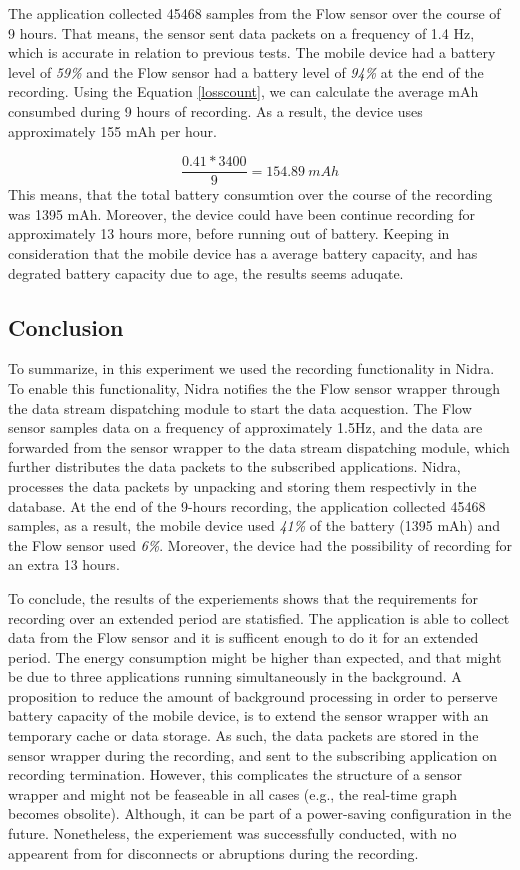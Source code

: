 The application collected 45468 samples from the Flow sensor over the course of 9 hours. That means, the sensor sent data packets on a frequency of 1.4 Hz, which is accurate in relation to previous tests. The mobile device had a battery level of \textit{59\%} and the Flow sensor had a battery level of \textit{94\%} at the end of the recording. Using the Equation \ref{losscount}, we can calculate the average mAh consumbed during 9 hours of recording. As a result, the device uses approximately 155 mAh per hour. 

\begin{equation}
\frac{0.41 * 3400}{9} = 154.89\ mAh
\end{equation}
This means, that the total battery consumtion over the course of the recording was 1395 mAh. Moreover, the device could have been continue recording for approximately 13 hours more, before running out of battery. Keeping in consideration that the mobile device has a average battery capacity, and has degrated battery capacity due to age, the results seems aduqate. 

\subsection{Conclusion}
To summarize, in this experiment we used the recording functionality in Nidra. To enable this functionality, Nidra notifies the the Flow sensor wrapper through the data stream dispatching module to start the data acquestion. The Flow sensor samples data on a frequency of approximately 1.5Hz, and the data are forwarded from the sensor wrapper to the data stream dispatching module, which further distributes the data packets to the subscribed applications. Nidra, processes the data packets by unpacking and storing them respectivly in the database. At the end of the 9-hours recording, the application collected 45468 samples, as a result, the mobile device used \textit{41\%} of the battery (1395 mAh) and the Flow sensor used \textit{6\%}. Moreover, the device had the possibility of recording for an extra 13 hours.

To conclude, the results of the experiements shows that the requirements for recording over an extended period are statisfied. The application is able to collect data from the Flow sensor and it is sufficent enough to do it for an extended period. The energy consumption might be higher than expected, and that might be due to three applications running simultaneously in the background. A proposition to reduce the amount of background processing in order to perserve battery capacity of the mobile device, is to extend the sensor wrapper with an temporary cache or data storage. As such, the data packets are stored in the sensor wrapper during the recording, and sent to the subscribing application on recording termination. However, this complicates the structure of a sensor wrapper and might not be feaseable in all cases (e.g., the real-time graph becomes obsolite). Although, it can be part of a power-saving configuration in the future.  Nonetheless, the experiement was successfully conducted, with no appearent from for disconnects or abruptions during the recording. 

